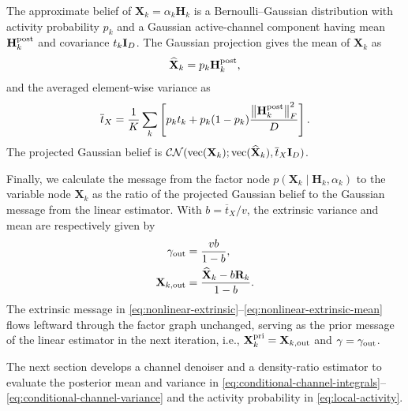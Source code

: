The approximate belief of $\mathbf X_k=\alpha_k\mathbf H_k$ is a
Bernoulli--Gaussian distribution with activity probability $p_k$
and a Gaussian active-channel component having mean
$\mathbf H_k^{\rm post}$ and covariance $t_k\mathbf{I}_D$.
The Gaussian projection gives the mean of $\mathbf X_k$ as
\begin{equation}
 \widehat{\mathbf X}_k=p_k\mathbf H_k^{\rm post},
 \label{eq:mixture}
\end{equation}
and the averaged element-wise variance as
\begin{equation}
 \overline t_X=\frac1K\sum_k\left[
 p_kt_k+p_k(1-p_k)\frac{\left\lVert\mathbf H_k^{\rm post}\right\rVert_F^2}{D}\right].
 \label{eq:joint-average-variance}
\end{equation}
The projected Gaussian belief is
$\mathcal{CN}(\operatorname{vec}(\mathbf X_k);\operatorname{vec}(\widehat{\mathbf X}_k),\overline t_X\mathbf{I}_D)$.

Finally, we calculate the message from the factor node
$p(\mathbf X_k\mid\mathbf H_k,\alpha_k)$ to the variable node
$\mathbf X_k$ as the ratio of the projected Gaussian belief to the
Gaussian message from the linear estimator. With $b=\overline t_X/v$, the extrinsic
variance and mean are respectively given by
\begin{align}
 \gamma_{\rm out}&=\frac{vb}{1-b},
 \label{eq:nonlinear-extrinsic}\\
 \mathbf X_{k,\rm out}&=\frac{\widehat{\mathbf X}_k-b\mathbf R_k}{1-b}.
 \label{eq:nonlinear-extrinsic-mean}
\end{align}
The extrinsic message in
\eqref{eq:nonlinear-extrinsic}--\eqref{eq:nonlinear-extrinsic-mean}
flows leftward through the factor graph unchanged, serving as the prior
message of the linear estimator in the next iteration, i.e.,
$\mathbf X_k^{\rm pri}=\mathbf X_{k,\rm out}$ and
$\gamma=\gamma_{\rm out}$.

The next section develops a channel denoiser and a density-ratio estimator
to evaluate the posterior mean and variance in
\eqref{eq:conditional-channel-integrals}--\eqref{eq:conditional-channel-variance}
and the activity probability in \eqref{eq:local-activity}.
